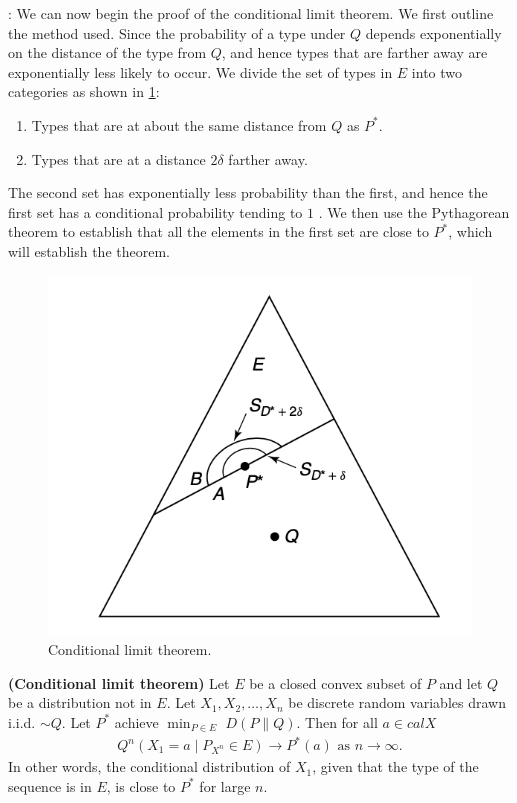 \documentclass{article}
\newcommand{\bfs}[1]{\textbf{({#1})}}
\begin{document}
:
We can now begin the proof of the conditional limit theorem. We first outline the method used. Since the probability of a type under $Q$ depends exponentially on the distance of the type from $Q$, and hence types that are farther away are exponentially less likely to occur. 
We divide the set of types in $E$ into two categories as shown in \cref{clt:fig5}: 
\begin{enumerate}
    \item Types that are at about the same distance from $Q$ as $P^{*}$.
    \item Types that are at a distance $2 \delta$ farther away.
\end{enumerate}
The second set has exponentially less probability than the first, and hence the first set has a conditional probability tending to $1$ . We then use the Pythagorean theorem to establish that all the elements in the first set are close to $P^{*}$, which will establish the theorem.
\begin{figure}[ht]
 \centering
 \includegraphics[width=0.5\linewidth]{Figs/fig5.png}
\centering
\caption{Conditional limit theorem.}
		\label{clt:fig5}
\end{figure}


\begin{thma}{\bfs{Conditional limit theorem}}\label{clt:thm2}
Let $E$ be a closed convex subset of $P$ and let $Q$ be a distribution not in $E .$ Let $X_{1}, X_{2}, \ldots, X_{n}$ be discrete random variables drawn i.i.d. $\sim Q .$ Let $P^{*}$ achieve $\min _{P \in E}$ $D(P \| Q) .$ Then for all $a\in calX$
\begin{align*}
Q^n\left(X_{1}=a \mid P_{X^{n}} \in E\right) \rightarrow P^{*}(a) \text{ as } n \rightarrow \infty. 
\end{align*}
In other words, the conditional distribution of $X_{1}$, given that the type of the sequence is in $E$, is close to $P^{*}$ for large $n$.
\end{thma}
\end{document}
